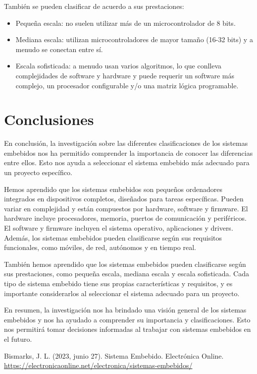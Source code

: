 \documentclass[12pt]{report}
\begin{document}
También se pueden clasificar de acuerdo a sus prestaciones:
\begin{itemize}
  \item Pequeña escala: no suelen utilizar más de un microcontrolador de 8 bits.
  \item Mediana escala: utilizan microcontroladores de mayor tamaño (16-32 bits) y a menudo se conectan entre sí.
  \item Escala sofisticada: a menudo usan varios algoritmos, lo que conlleva complejidades de software y hardware y puede requerir un software más complejo, un procesador configurable y/o una matriz lógica programable.
\end{itemize}
\newpage


\chapter{Conclusiones}
En conclusión, la investigación sobre las diferentes clasificaciones de los sistemas embebidos nos ha permitido comprender la importancia de conocer las diferencias entre ellos. Esto nos ayuda a seleccionar el sistema embebido más adecuado para un proyecto específico.

Hemos aprendido que los sistemas embebidos son pequeños ordenadores integrados en dispositivos completos, diseñados para tareas específicas. Pueden variar en complejidad y están compuestos por hardware, software y firmware. El hardware incluye procesadores, memoria, puertos de comunicación y periféricos. El software y firmware incluyen el sistema operativo, aplicaciones y drivers. Además, los sistemas embebidos pueden clasificarse según sus requisitos funcionales, como móviles, de red, autónomos y en tiempo real.

También hemos aprendido que los sistemas embebidos pueden clasificarse según sus prestaciones, como pequeña escala, mediana escala y escala sofisticada. Cada tipo de sistema embebido tiene sus propias características y requisitos, y es importante considerarlos al seleccionar el sistema adecuado para un proyecto.

En resumen, la investigación nos ha brindado una visión general de los sistemas embebidos y nos ha ayudado a comprender su importancia y clasificaciones. Esto nos permitirá tomar decisiones informadas al trabajar con sistemas embebidos en el futuro.


\begin{thebibliography}{1}
 Bismarks, J. L. (2023, junio 27). Sistema Embebido. Electrónica Online. \url{https://electronicaonline.net/electronica/sistemas-embebidos/}

\end{thebibliography}
\end{document}
